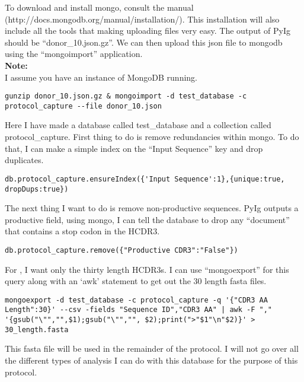 To download and install mongo, consult the manual \\ (http://docs.mongodb.org/manual/installation/). This installation will also include all the tools that making uploading files very easy. The output of PyIg should be ``donor\_10.json.gz''. We can then upload this json file to mongodb using the ``mongoimport'' application. \\

\textbf{Note:} \\
I assume you have an instance of MongoDB running.

\begin{lstlisting}[breaklines=true]
gunzip donor_10.json.gz & mongoimport -d test_database -c protocol_capture --file donor_10.json
\end{lstlisting}

Here I have made a database called test\_database and a collection called protocol\_capture. First thing to do is remove redundancies within mongo. To do that, I can make a simple index on the ``Input Sequence'' key and drop duplicates.

\begin{lstlisting}[breaklines=true]
db.protocol_capture.ensureIndex({'Input Sequence':1},{unique:true, dropDups:true})
\end{lstlisting}

The next thing I want to do is remove non-productive sequences. PyIg outputs a productive field, using mongo, I can tell the database to drop any ``document'' that contains a stop codon in the HCDR3.

\begin{lstlisting}[breaklines=true]
db.protocol_capture.remove({"Productive CDR3":"False"})
\end{lstlisting}

For \rosetta, I want only the thirty length HCDR3s. I can use ``mongoexport'' for this query along with an `awk' statement to get out the 30 length fasta files.

\begin{lstlisting}[breaklines=true]
mongoexport -d test_database -c protocol_capture -q '{"CDR3 AA Length":30}' --csv -fields "Sequence ID","CDR3 AA" | awk -F "," '{gsub("\"","",$1);gsub("\"","", $2);print(">"$1"\n"$2)}' > 30_length.fasta
\end{lstlisting}

This fasta file will be used in the remainder of the protocol. I will not go over all the different types of analysis I can do with this database for the purpose of this protocol.


